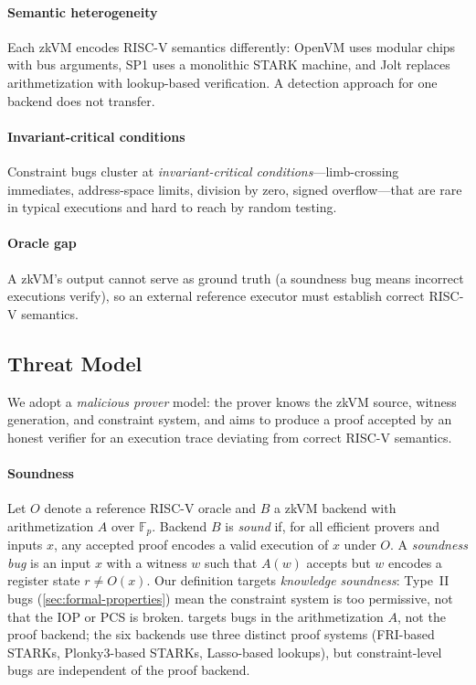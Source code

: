 \paragraph{Semantic heterogeneity}
Each zkVM encodes RISC-V semantics differently: OpenVM uses modular chips with bus arguments, SP1 uses a monolithic STARK machine, and Jolt replaces arithmetization with lookup-based verification. A detection approach for one backend does not transfer.

\paragraph{Invariant-critical conditions}
Constraint bugs cluster at \emph{invariant-critical conditions}---limb-crossing immediates, address-space limits, division by zero, signed overflow---that are rare in typical executions and hard to reach by random testing.

\paragraph{Oracle gap}
A zkVM's output cannot serve as ground truth (a soundness bug means incorrect executions verify), so an external reference executor must establish correct RISC-V semantics.

\subsection{Threat Model}\label{sec:bg-threat}

We adopt a \emph{malicious prover} model: the prover knows the zkVM source, witness generation, and constraint system, and aims to produce a proof accepted by an honest verifier for an execution trace deviating from correct RISC-V semantics.

\paragraph{Soundness}
Let $O$ denote a reference RISC-V oracle and $B$ a zkVM backend with arithmetization $A$ over $\mathbb{F}_p$. Backend $B$ is \emph{sound} if, for all efficient provers and inputs $x$, any accepted proof encodes a valid execution of $x$ under $O$. A \emph{soundness bug} is an input $x$ with a witness $w$ such that $A(w)$ accepts but $w$ encodes a register state $r \neq O(x)$. Our definition targets \emph{knowledge soundness}: Type~II bugs (\autoref{sec:formal-properties}) mean the constraint system is too permissive, not that the IOP or PCS is broken. \tool targets bugs in the arithmetization $A$, not the proof backend; the six backends use three distinct proof systems (FRI-based STARKs, Plonky3-based STARKs, Lasso-based lookups), but constraint-level bugs are independent of the proof backend.

